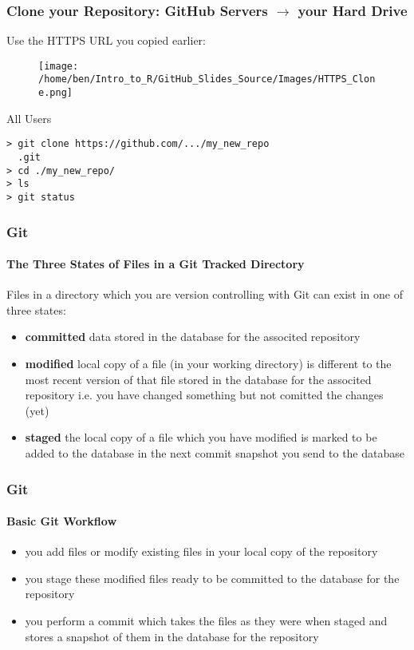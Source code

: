 \documentclass[xcolor=dvipsnames]{beamer}
\begin{document}
\begin{frame}[fragile]
\frametitle{Clone your Repository: GitHub Servers $\rightarrow$ your Hard Drive}
Use the HTTPS URL you copied earlier:\\
\begin{center}
\begin{figure}
\texttt{[image: /home/ben/Intro\_to\_R/GitHub\_Slides\_Source/Images/HTTPS\_Clone.png]}
\end{figure}
\end{center}

\begin{block}{All Users}
\begin{lstlisting}
> git clone https://github.com/.../my_new_repo
  .git
> cd ./my_new_repo/
> ls
> git status
\end{lstlisting}
\end{block}
\end{frame}

\begin{frame} 
\frametitle{Git}
\framesubtitle{The Three States of Files in a Git Tracked Directory}
Files in a directory which you are version controlling with Git can exist in one of three states:
\begin{itemize}
\item \textbf{committed} data stored in the database for the associted repository
\item \textbf{modified} local copy of a file (in your working directory) is different to the most recent version of that file stored in the database for the associted repository i.e. you have changed something but not comitted the changes (yet)
\item \textbf{staged} the local copy of a file which you have modified is marked to be added to the database in the next commit snapshot you send to the database
\end{itemize}
\end{frame}

\begin{frame} 
\frametitle{Git}
\framesubtitle{Basic Git Workflow}
\begin{itemize}
\item you add files or modify existing files in your local copy of the repository
\item you stage these modified files ready to be committed to the database for the repository
\item you perform a commit which takes the files as they were when staged and stores a snapshot of them in the database for the repository
\end{itemize}
\end{frame}
\end{document}
